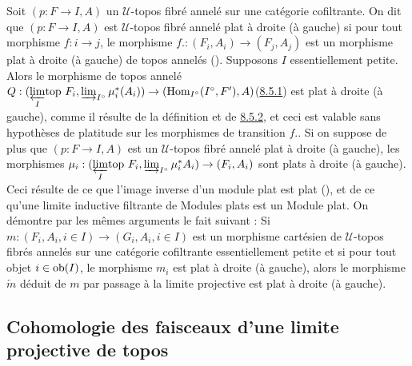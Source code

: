 \documentclass[10pt]{../fichiers-configuration-latex/smfart}
\begin{document}
Soit $(p : F \to I, A)$ un $𝒰$-topos fibré annelé sur une catégorie
cofiltrante. On dit que $(p : F \to I, A)$ est $𝒰$-topos fibré annelé
plat à droite (\resp à gauche) si pour tout morphisme $f : i \to j$,
le morphisme $f. : (F_i, A_i) \to (F_j, A_j)$ est un morphisme plat à
droite (\resp à gauche) de topos annelés (). Supposons $I$
essentiellement petite. Alors le morphisme de topos annelé
 $Q : (\limtop{I} F_i,
\varinjlim_{I^{\circ}} \mu^{\ast}_i (A_i)) \to (\Hom_{I^{\circ}}
(I^{\circ}, F'), A)$\pageoriginale (\hyperref[VI.subsubsec8.5.1]{8.5.1}) est
plat à droite (\resp à gauche), comme il résulte de la définition et
de \hyperref[VI.prop8.5.2]{8.5.2}, et ceci est valable sans hypothèses de
platitude sur les morphismes de transition $f.$. Si on suppose de
plus que $(p : F \to I, A)$ est un $𝒰$-topos fibré annelé
plat à droite (\resp à gauche), les morphismes $\mu_i : (\limtop{I}
F_i, \varinjlim_{I^{\circ}} \mu^{\ast}_i A_i) \to (F_i, A_i)$ sont
plats à droite (\resp à gauche). Ceci résulte de ce que l'image
inverse d'un module plat est plat (), et de ce
qu'une limite inductive filtrante de Modules plats est un Module
plat. On démontre par les mêmes arguments le fait suivant : Si $m :
(F_i, A_i, i \in I) \to (G_i, A_i, i \in I)$ est un morphisme
cartésien de $𝒰$-topos fibrés annelés sur une catégorie
cofiltrante essentiellement petite et si pour tout objet $i \in \operatorname{ob}
(I)$, le morphisme $m_i$ est plat à droite (\resp à gauche), alors
le morphisme $\underleftarrow{m}$ déduit de $m$ par passage à la
limite projective est plat à droite (\resp à gauche).

\subsection{Cohomologie des faisceaux d'une limite projective de
  topos}

\subsubsection{}
\end{document}

